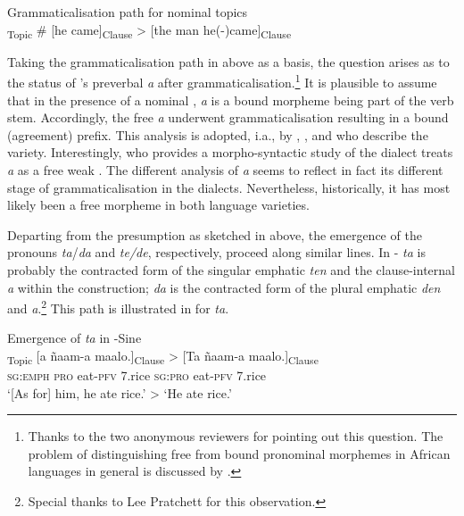 \documentclass[output=paper,newtxmath,modfonts,nonflat,hidelinks]{langsci/langscibook}
\begin{document}
\ea\label{ex:apel:13}
{Grammaticalisation path for nominal  topics \citep[adapted from][155]{Givon76}}\\
\textsubscript{Topic} \# [he came]\textsubscript{Clause} > [the man he(-)came]\textsubscript{Clause}
\z

Taking the grammaticalisation path in  above as a basis, the question arises as to the status of ’s preverbal \textit{a} after grammaticalisation.\footnote{Thanks to the two anonymous reviewers for pointing out this question. The problem of distinguishing free from bound pronominal morphemes in African languages in general is discussed by \citet{Creissels2005typology}.} It is plausible to assume that in the presence of a nominal , \textit{a} is a bound morpheme being part of the verb stem. Accordingly, the free  \textit{a} underwent grammaticalisation resulting in a bound (agreement) prefix. This analysis is adopted, i.a., by \citet{Renaudier2012}, \citet{Neely2013}, and \citet{Heath2014} who describe the  variety. Interestingly, \citet{Faye1979} who provides a morpho-syntactic study of the  dialect treats \textit{a} as a free weak  \citep[also][]{FayeMous06}. The different analysis of \textit{a} seems to reflect in fact its different stage of grammaticalisation in the dialects. Nevertheless, historically, it has most likely been a free morpheme in both language varieties.    

Departing from the presumption as sketched in  above, the emergence of the  pronouns \textit{ta}/\textit{da} and \textit{te/de}, respectively, proceed along similar lines. In - \textit{ta} is probably the contracted form of the singular emphatic  \textit{ten} and the clause-internal  \textit{a} within the  construction; \textit{da} is the contracted form of the plural emphatic  \textit{den} and \textit{a}.\footnote{Special thanks to Lee Pratchett for this observation.} This path is illustrated in  for \textit{ta}.

\ea\label{ex:apel:14}
{Emergence of \textit{ta} in -Sine}\\
\gll   [Ten]\textsubscript{Topic} [a ñaam-a maalo.]\textsubscript{Clause} > [Ta ñaam-a maalo.]\textsubscript{Clause}\\
     \textsc{sg:emph} \textsc{pro} eat\textsc{-pfv} \textsc{7.}rice {} \textsc{sg:pro} eat\textsc{-pfv} \textsc{7.}rice\\
\glt ‘[As for] him, he ate rice.’ > ‘He ate rice.’
\z
\end{document}

